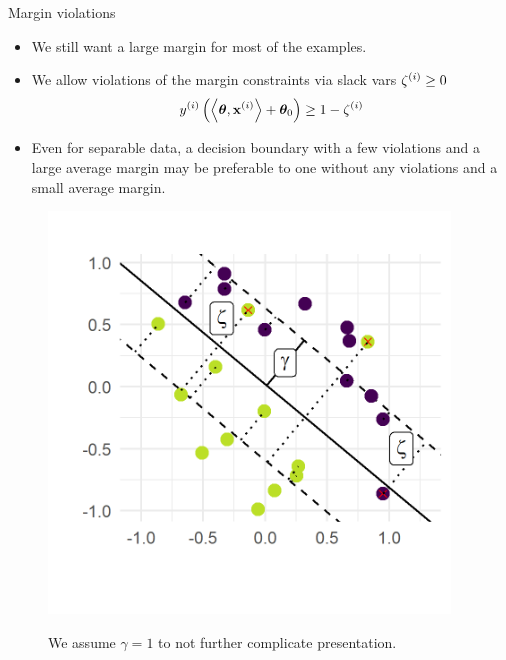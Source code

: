\documentclass[11pt,compress,t,notes=noshow, xcolor=table]{beamer}
\begin{document}
\begin{vbframe}{Margin violations}

  \begin{itemize}
    \item We still want a large margin for most of the examples.
    \item We allow violations of the margin constraints via slack vars $\zeta^{(i)} \geq 0$
    $$
    y^{(i)} \left( \left\langle \bm{\theta}, \mathbf{x}^{(i)} \right\rangle + \bm{\theta}_0 \right) \geq 1 - \zeta^{(i)}
    $$
    \item Even for separable data, a decision boundary with a few violations and a large average margin may be preferable to one without any violations and a small average margin.
\end{itemize}

\begin{figure}[htbp]
	\begin{minipage}{0.5\textwidth}
\begin{center}
 \includegraphics[width = 0.95\textwidth]{figure/boundary_with_violations.png} 
\end{center}
	\end{minipage}
	\hfill
	\begin{minipage}{0.35\textwidth}
 We assume $\gamma=1$ to not further complicate presentation.
	\end{minipage}
\end{figure}


\end{vbframe}
\end{document}
